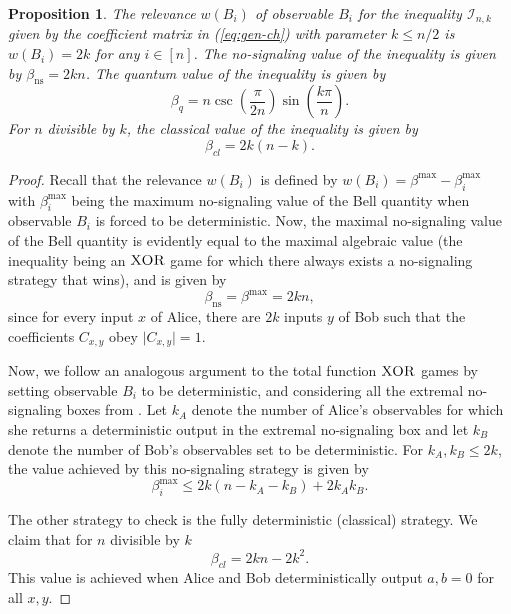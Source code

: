 \documentclass[pra,twocolumn,showpacs,preprintnumbers,amsmath,amssymb,superscriptaddress]{revtex4-1}
\newtheorem{prop}{Proposition}
\begin{document}
\begin{appendix}
\begin{prop}
The relevance $w(B_i)$ of observable $B_i$ for the inequality $\mathcal{I}_{n,k}$ given by the coefficient matrix in (\ref{eq:gen-ch}) with parameter $k \leq n/2$ is $w(B_i) = 2k$ for any $i \in [n]$. The no-signaling value of the inequality is given by $\beta_{\text{ns}} = 2 k n$. The quantum value of the inequality is given by 
\begin{equation}
\beta_{q} =  n \csc{\left(\frac{\pi}{2n} \right)} \sin{\left(\frac{k\pi}{n} \right)}.
\end{equation}
For $n$ divisible by $k$, the classical value of the inequality is given by
\begin{equation}
\beta_{cl} = 2 k (n - k).
\end{equation}
\end{prop}
\begin{proof}
Recall that the relevance $w(B_i)$ is defined by $w(B_i) = \beta^{\text{max}} - \beta_{i}^{\text{max}}$ with $\beta_{i}^{\text{max}}$ being the maximum no-signaling value of the Bell quantity when observable $B_i$ is forced to be deterministic. Now, the maximal no-signaling value of the Bell quantity is evidently equal to the maximal algebraic value (the inequality being an $\textsc{XOR}$ game for which there always exists a no-signaling strategy that wins), and is given by 
\begin{equation}
\beta_{\text{ns}} = \beta^{\text{max}} = 2 k n,
\end{equation}
since for every input $x$ of Alice, there are $2k$ inputs $y$ of Bob such that the coefficients $C_{x,y}$ obey $\vert C_{x,y} \vert = 1$.  

Now, we follow an analogous argument to the total function $\textsc{XOR}$ games by setting observable $B_i$ to be deterministic, and considering all the extremal no-signaling boxes from \cite{JonesMasanes2005}. Let $k_A$ denote the number of Alice's observables for which she returns a deterministic output in the extremal no-signaling box and let $k_B$ denote the number of Bob's observables set to be deterministic. For $k_A, k_B \leq 2k$, the value achieved by this no-signaling strategy is given by
\begin{equation}
\label{eq:beta-i-max}
\beta_{i}^{\text{max}} \leq 2k (n - k_A - k_B) + 2 k_A k_B.  
\end{equation}

The other strategy to check is the fully deterministic (classical) strategy. We claim that for $n$ divisible by $k$ 
\begin{equation}
\label{eq:cl-val}
\beta_{cl} = 2k n - 2k^2. 
\end{equation}
This value is achieved when Alice and Bob deterministically output $a, b = 0$ for all $x, y$. 


\end{proof}
\end{appendix}
\end{document}
